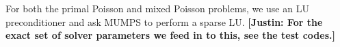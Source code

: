 \documentclass[format=acmsmall,screen,timestamp=false,a4paper]{acmart}
\newcommand\josh[1]{\textbf{\textcolor[rgb]{0,.5,1}{[Josh: #1]}}}
\newcommand\justin[1]{\textbf{\textcolor[rgb]{0,1,0.5}{[Justin: #1]}}}
\newcommand\lm[1]{\textbf{\textcolor[rgb]{1,0,0.5}{[Lawrence: #1]}}}
\begin{document}
For both the primal Poisson and mixed Poisson problems, we use an LU preconditioner and ask MUMPS to perform a sparse LU.  \justin{For the exact set of solver parameters we feed in to this, see the test codes.}



\end{document}
